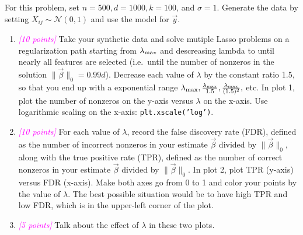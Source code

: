 \documentclass{article}
\newcommand{\points}[1]{\small\textcolor{magenta}{\emph{[#1 points]}} \normalsize}
\begin{document}
\vspace{1em}
For this problem, set $n = 500, d= 1000, k=100$, and $\sigma =1$.
Generate the data by setting $X_{ij} \sim \mathcal{N}(0,1)$
and use the model for $\vec y$.

\begin{enumerate}
\item \points{10} Take your synthetic data and solve mutiple Lasso problems
  on a regularization path starting from $\lambda_{\rm max}$ 
  and descreasing lambda to until nearly all features are selected
  (i.e.\ until the number of nonzeros in the solution $\| \vec \beta \|_0 = 0.99 d$).
  Decrease each value of $\lambda$ by the constant ratio 1.5,
  so that you end up with a exponential range
  $\lambda_{\rm max}, \frac{\lambda_{\rm max}}{1.5}, 
  \frac{\lambda_{\rm max}}{(1.5)^2},$ etc.
  In plot 1, plot the number of nonzeros on the y-axis versus $\lambda$ on the x-axis.
  Use logarithmic scaling on the x-axis: {\tt plt.xscale('log')}.
\item \points{10} For each value of $\lambda$, record the false discovery rate (FDR),
  defined as the number of incorrect nonzeros in your estimate $\vec \beta$
  divided by $\| \vec \beta \|_0$,
  along with the true positive rate (TPR),
  defined as the number of correct nonzeros in your estimate $\vec \beta$
  divided by $\| \vec \beta \|_0$.
  In plot 2, plot TPR (y-axis) versus FDR (x-axis). 
  Make both axes go from 0 to 1 and color your points by the value of $\lambda$.
  The best possible situation would be to have high TPR and low FDR, 
  which is in the upper-left corner of the plot.
\item \points{5} Talk about the effect of $\lambda$ in these two plots.
\end{enumerate}
\end{document}
